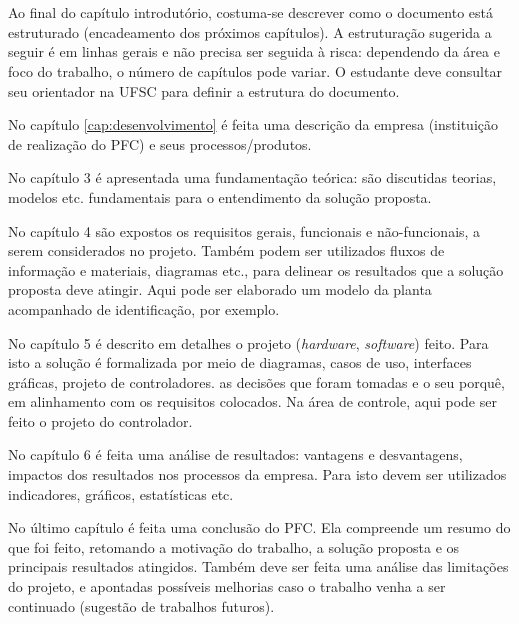 
\section*{}

Ao final do capítulo introdutório, costuma-se descrever como o documento está estruturado (encadeamento dos próximos capítulos). A estruturação sugerida a seguir é em linhas gerais e não precisa ser seguida à risca: dependendo da área e foco do trabalho, o número de capítulos pode variar. O estudante deve consultar seu orientador na UFSC para definir a estrutura do documento.

No capítulo \ref{cap:desenvolvimento} é feita uma descrição da empresa (instituição de realização do PFC) e seus processos/produtos.

No capítulo 3 é apresentada uma fundamentação teórica: são discutidas teorias, modelos etc. fundamentais para o entendimento da solução proposta.

No capítulo 4 são expostos os requisitos gerais, funcionais e não-funcionais, a serem considerados no projeto. Também podem ser utilizados fluxos de informação e materiais, diagramas etc., para delinear os resultados que a solução proposta deve atingir. Aqui pode ser elaborado um modelo da planta acompanhado de identificação, por exemplo.

No capítulo 5 é descrito em detalhes o projeto (\emph{hardware}, \emph{software}) feito. Para isto a solução é formalizada por meio de diagramas, casos de uso, interfaces gráficas, projeto de controladores. as decisões que foram tomadas e o seu porquê, em alinhamento com os requisitos colocados. Na área de controle, aqui pode ser feito o projeto do controlador.

No capítulo 6 é feita uma análise de resultados: vantagens e desvantagens, impactos dos resultados nos processos da empresa. Para isto devem ser utilizados indicadores, gráficos, estatísticas etc.

No último capítulo é feita uma conclusão do PFC. Ela compreende um resumo do que foi feito, retomando a motivação do trabalho, a solução proposta e os principais resultados atingidos. Também deve ser feita uma análise das limitações do projeto, e apontadas possíveis melhorias caso o trabalho venha a ser continuado (sugestão de trabalhos futuros).